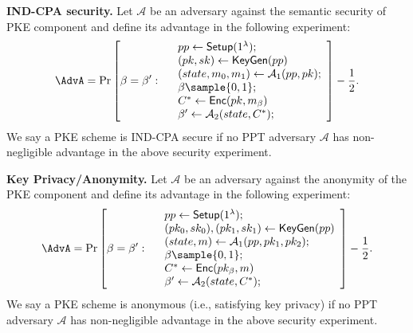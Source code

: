 \documentclass[a4paper,10pt]{article}
\begin{document}
\begin{trivlist}
\item \textbf{IND-CPA security.} Let $\mathcal{A}$ be an adversary against the semantic security of 
PKE component and define its advantage in the following experiment:
\begin{displaymath}
    \AdvA = \Pr \left[\beta=\beta': 
    \begin{array}{ll}
        & pp \leftarrow \mathsf{Setup}(1^\lambda); \\
        & (pk, sk) \leftarrow \mathsf{KeyGen}(pp)\\
        & (state, m_0, m_1) \leftarrow \mathcal{A}_1(pp, pk);\\
        & \beta \sample \{0,1\};\\
        & C^* \leftarrow \mathsf{Enc}(pk, m_\beta)\\
        & \beta' \leftarrow \mathcal{A}_2(state, C^*);
    \end{array}
    \right] - \frac{1}{2}.
\end{displaymath}
We say a PKE scheme is IND-CPA secure if no PPT adversary $\mathcal{A}$ 
has non-negligible advantage in the above security experiment.
\end{trivlist}



\begin{trivlist}
\item \textbf{Key Privacy/Anonymity.} Let $\mathcal{A}$ be an adversary against the anonymity of the PKE component 
and define its advantage in the following experiment:
\begin{displaymath}
    \AdvA = \Pr \left[\beta=\beta': 
    \begin{array}{ll}
        & pp \leftarrow \mathsf{Setup}(1^\lambda); \\
        & (pk_0, sk_0), (pk_1, sk_1) \leftarrow \mathsf{KeyGen}(pp)\\
        & (state, m) \leftarrow \mathcal{A}_1(pp, pk_1, pk_2);\\
        & \beta \sample \{0,1\};\\
        & C^* \leftarrow \mathsf{Enc}(pk_\beta, m)\\
        & \beta' \leftarrow \mathcal{A}_2(state, C^*);
    \end{array}
    \right] - \frac{1}{2}.
\end{displaymath}
We say a PKE scheme is anonymous (i.e., satisfying key privacy) if no PPT adversary $\mathcal{A}$ 
has non-negligible advantage in the above security experiment.
\end{trivlist}  
\end{document}
